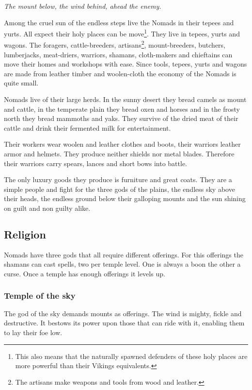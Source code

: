 \documentclass[a4paper]{book}
\begin{document}
	\begin{flushright}
		\emph{The mount below, the wind behind, ahead the enemy.}
	\end{flushright}

	Among the cruel sun of the endless steps live the \gls{Nomads} in their tepees and yurts.
	All expect their holy places can be move\footnote{
		This also means that the naturally spawned defenders of these holy
		places are more powerful than their \gls{Vikings} equivalents.
	}.
	They live in tepees, yurts and wagons.
	The foragers, cattle-breeders, artisans\footnote{
		The artisans make weapons and tools from wood and leather.
	}, 
	mount-breeders, butchers, lumberjacks, meat-driers, warriors, shamans, cloth-makers 
	and chieftains can move their homes and workshops with ease.
	Since tools, tepees, yurts and wagons are made from leather timber and woolen-cloth
	the economy of the \gls{Nomads} is quite small.

	\Gls{Nomads} live of their large herds. In the sunny desert they bread camels as mount
	and cattle, in the temperate plain they bread oxen and horses and in the frosty north 
	they bread mammoths and yaks.
	They survive of the dried meat of their cattle and drink their fermented milk for
	entertainment.

	Their workers wear woolen and leather clothes and boots,
	their warriors leather armor and helmets.
	They produce neither shields nor metal blades.
	Therefore their warriors carry spears, lances and short bows into battle.

	The only luxury goods they produce is furniture and great coats.
	They are a simple people and fight for the three gods of the plains,
	the endless sky above their heads, the endless ground below their galloping
	mounts and the sun shining on guilt and non guilty alike.

	\subsection{Religion}
		\Gls{Nomads} have three gods that all require different offerings.
		For this offerings the shamans can cast spells, two per temple level.
		One is always a boon the other a curse.
		Once a temple has enough offerings it levels up.

		\subsubsection{Temple of the sky}
			The god of the sky demands mounts as offerings.
			The wind is mighty, fickle and destructive.
			It bestows its power upon those that can ride with it,
			enabling them to lay their foe low.
\end{document}
